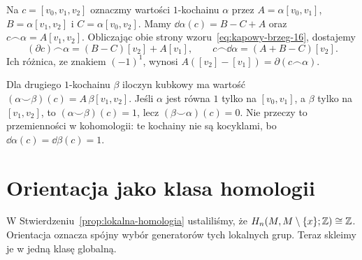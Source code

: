 \begin{przyklad}
\label{prz:kubek-kap-trojkat-21}
Na $c=[v_0,v_1,v_2]$ oznaczmy wartości $1$-kochainu $\alpha$
przez $A=\alpha[v_0,v_1]$, $B=\alpha[v_1,v_2]$ i
$C=\alpha[v_0,v_2]$.
Mamy $\dd\alpha(c)=B-C+A$ oraz $c\frown\alpha=A[v_1,v_2]$.
Obliczając obie strony wzoru~\eqref{eq:kapowy-brzeg-16},
dostajemy
\[
 (\partial c)\frown\alpha=(B-C)[v_2]+A[v_1],\qquad
 c\frown\dd\alpha=(A+B-C)[v_2].
\]
Ich różnica, ze znakiem $(-1)^1$, wynosi
$A([v_2]-[v_1])=\partial(c\frown\alpha)$.

Dla drugiego $1$-kochainu $\beta$ iloczyn kubkowy ma wartość
$(\alpha\smile\beta)(c)=A\,\beta[v_1,v_2]$.
Jeśli $\alpha$ jest równa $1$ tylko na $[v_0,v_1]$,
a $\beta$ tylko na $[v_1,v_2]$, to
$(\alpha\smile\beta)(c)=1$, lecz $(\beta\smile\alpha)(c)=0$.
Nie przeczy to przemienności w kohomologii:
te kochainy nie są kocyklami, bo
$\dd\alpha(c)=\dd\beta(c)=1$.

\begin{center}
\end{center}
\end{przyklad}

\section{Orientacja jako klasa homologii}
\label{sec:klasa-fundamentalna-16}

W Stwierdzeniu~\ref{prop:lokalna-homologia}
ustaliliśmy, że
$H_n(M,M\setminus\{x\};\mathbb{Z})\cong\mathbb{Z}$.
Orientacja oznacza spójny wybór
generatorów tych lokalnych grup.
Teraz skleimy je w jedną klasę
globalną.

